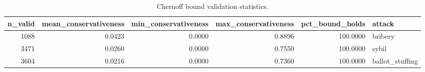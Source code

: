 \begin{table}
\caption{Chernoff bound validation statistics.}
\label{tab:chernoff_validation}
\begin{tabular}{rrrrrl}
\toprule
n\_valid & mean\_conservativeness & min\_conservativeness & max\_conservativeness & pct\_bound\_holds & attack \\
\midrule
1088 & 0.0423 & 0.0000 & 0.8896 & 100.0000 & bribery \\
3471 & 0.0260 & 0.0000 & 0.7550 & 100.0000 & sybil \\
3604 & 0.0216 & 0.0000 & 0.7360 & 100.0000 & ballot\_stuffing \\
\bottomrule
\end{tabular}
\end{table}

